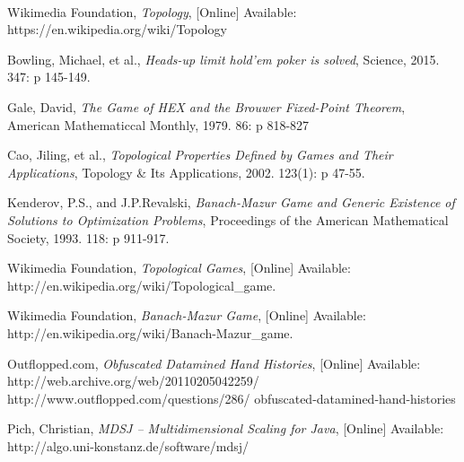 \documentclass[11pt]{article}
\begin{document}
\newpage
~
\newpage
\begin{thebibliography}{9}

  Wikimedia Foundation,
  \emph{Topology},
  [Online] Available:
  https://en.wikipedia.org/wiki/Topology

  Bowling, Michael, et al.,
  \emph{Heads-up limit hold'em poker is solved},
  Science,
  2015. 347: p 145-149.
  
  Gale, David,
  \emph{The Game of HEX and the Brouwer Fixed-Point Theorem},
  American Mathematiccal Monthly,
  1979. 86: p 818-827
	
  Cao, Jiling, et al.,
  \emph{Topological Properties Defined by Games and Their Applications},
  Topology \& Its Applications,
  2002. 123(1): p 47-55.
  
  Kenderov, P.S., and J.P.Revalski,
  \emph{Banach-Mazur Game and Generic Existence of Solutions to Optimization Problems},
  Proceedings of the American Mathematical Society,
  1993. 118: p 911-917.
  
  Wikimedia Foundation,
  \emph{Topological Games},
  [Online]
  Available: http://en.wikipedia.org/wiki/Topological\_game.

  Wikimedia Foundation,
  \emph{Banach-Mazur Game},
  [Online] Available:
  http://en.wikipedia.org/wiki/Banach-Mazur\_game.
  
  Outflopped.com,
  \emph{Obfuscated Datamined Hand Histories},
  [Online] Available:
  http://web.archive.org/web/20110205042259/
  http://www.outflopped.com/questions/286/
  obfuscated-datamined-hand-histories
  
  Pich, Christian,
  \emph{MDSJ – Multidimensional Scaling for Java},
  [Online] Available: 
  http://algo.uni-konstanz.de/software/mdsj/

	
\end{thebibliography}
\end{document}
